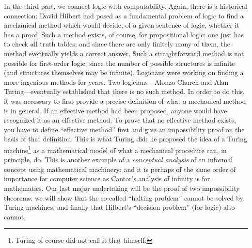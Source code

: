 In the third part, we connect logic with computability.  Again, there
is a historical connection: David Hilbert had posed as a fundamental
problem of logic to find a mechanical method which would decide, of a
given sentence of logic, whether it has a proof. Such a method exists,
of course, for propositional logic: one just has to check all truth
tables, and since there are only finitely many of them, the method
eventually yields a correct answer.  Such a straightforward method is
not possible for first-order logic, since the number of possible
structures is infinite (and structures themselves may be
infinite). Logicians were working on finding a more ingenious methods
for years.  Two logicians---Alonzo Church and Alan Turing---eventually
established that there is no such method.  In order to do this, it was
necessary to first provide a precise definition of what a
mechanical method is in general. If an effective method had been
proposed, anyone would have recognized it as an effective method. To
prove that no effective method exists, you have to define ``effective
method'' first and give an impossibility proof on the basis of that
definition.  This is what Turing did: he proposed the idea of a Turing
machine\footnote{Turing of course did not call it that himself.} as a
mathematical model of what a mechanical procedure can, in principle,
do.  This is another example of a \emph{conceptual analysis} of an
informal concept using mathematical machinery; and it is perhaps of
the same order of importance for computer science as Cantor's analysis
of infinity is for mathematics.  Our last major undertaking will be
the proof of two impossibility theorems: we will show that the
so-called ``halting problem'' cannot be solved by Turing machines, and
finally that Hilbert's ``decision problem'' (for logic) also cannot.

